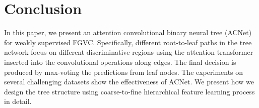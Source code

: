 \documentclass[10pt,twocolumn,letterpaper]{article}
\begin{document}
\section{Conclusion}
In this paper, we present an attention convolutional binary neural tree (ACNet) for weakly supervised FGVC. Specifically, different root-to-leaf paths in the tree network focus on different discriminative regions using the attention transformer inserted into the convolutional operations along edges. The final decision is produced by max-voting the predictions from leaf nodes. The experiments on several challenging datasets show the effectiveness of ACNet. We present how we design the tree structure using coarse-to-fine hierarchical feature learning process in detail.

{\small


}
\end{document}
